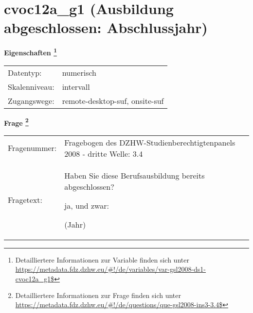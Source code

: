 
    \setcounter{footnote}{0}

    \vspace*{-1.8cm}
	\section{cvoc12a\_g1 (Ausbildung abgeschlossen: Abschlussjahr)}
	\label{section:cvoc12a_g1}



    \vspace*{0.5cm}
    \noindent\textbf{Eigenschaften
	\footnote{Detailliertere Informationen zur Variable finden sich unter
		\url{https://metadata.fdz.dzhw.eu/\#!/de/variables/var-gsl2008-ds1-cvoc12a_g1$}}}\\
	\begin{tabularx}{\hsize}{@{}lX}
	Datentyp: & numerisch \\
	Skalenniveau: & intervall \\
	Zugangswege: &
	  remote-desktop-suf, 
	  onsite-suf
 \\
    \end{tabularx}



				\vspace*{0.5cm}
                \noindent\textbf{Frage
	                \footnote{Detailliertere Informationen zur Frage finden sich unter
		              \url{https://metadata.fdz.dzhw.eu/\#!/de/questions/que-gsl2008-ins3-3.4$}}}\\
				\begin{tabularx}{\hsize}{@{}lX}
					Fragenummer: &
					  Fragebogen des DZHW-Studienberechtigtenpanels 2008 - dritte Welle:
					  3.4
 \\
					Fragetext: & Haben Sie diese Berufsausbildung bereits abgeschlossen?\par  ja, und zwar:\par  (Jahr) \\
				\end{tabularx}





